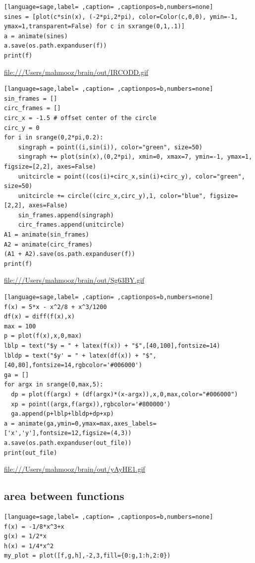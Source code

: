 \documentclass[a4paper,12pt]{article}
\begin{document}
\begin{lstlisting}[language=sage,label= ,caption= ,captionpos=b,numbers=none]
sines = [plot(c*sin(x), (-2*pi,2*pi), color=Color(c,0,0), ymin=-1, ymax=1,transparent=False) for c in sxrange(0,1,.1)]
a = animate(sines)
a.save(os.path.expanduser(f))
print(f)
\end{lstlisting}

\url{file:///Users/mahmooz/brain/out/IRCODD.gif}\\[0pt]

\begin{lstlisting}[language=sage,label= ,caption= ,captionpos=b,numbers=none]
sin_frames = []
circ_frames = []
circ_x = -1.5 # offset center of the circle
circ_y = 0
for i in srange(0,2*pi,0.2):
    singraph = point((i,sin(i)), color="green", size=50)
    singraph += plot(sin(x),(0,2*pi), xmin=0, xmax=7, ymin=-1, ymax=1, figsize=[2,2], axes=False)
    unitcircle = point((cos(i)+circ_x,sin(i)+circ_y), color="green", size=50)
    unitcircle += circle((circ_x,circ_y),1, color="blue", figsize=[2,2], axes=False)
    sin_frames.append(singraph)
    circ_frames.append(unitcircle)
A1 = animate(sin_frames)
A2 = animate(circ_frames)
(A1 + A2).save(os.path.expanduser(f))
print(f)
\end{lstlisting}

\url{file:///Users/mahmooz/brain/out/Sg63BY.gif}\\[0pt]

\begin{lstlisting}[language=sage,label= ,caption= ,captionpos=b,numbers=none]
f(x) = 5*x - x^2/8 + x^3/1200
df(x) = diff(f(x),x)
max = 100
p = plot(f(x),x,0,max)
lblp = text("$y = " + latex(f(x)) + "$",[40,100],fontsize=14)
lbldp = text("$y' = " + latex(df(x)) + "$",[40,80],fontsize=14,rgbcolor='#006000')
ga = []
for argx in srange(0,max,5):
  dp = plot(f(argx) + (df(argx)*(x-argx)),x,0,max,color="#006000")
  xp = point((argx,f(argx)),rgbcolor='#800000')    
  ga.append(p+lblp+lbldp+dp+xp)
a = animate(ga,ymin=0,ymax=max,axes_labels=['x','y'],fontsize=12,figsize=(4,3))
a.save(os.path.expanduser(out_file))
print(out_file)
\end{lstlisting}

\url{file:///Users/mahmooz/brain/out/yAyHE1.gif}\\[0pt]

\subsection{area between functions}
\label{sec:orgfbdc8ca}
\begin{lstlisting}[language=sage,label= ,caption= ,captionpos=b,numbers=none]
f(x) = -1/8*x^3+x
g(x) = 1/2*x
h(x) = 1/4*x^2
my_plot = plot([f,g,h],-2,3,fill={0:g,1:h,2:0})

\end{lstlisting}
\end{document}

